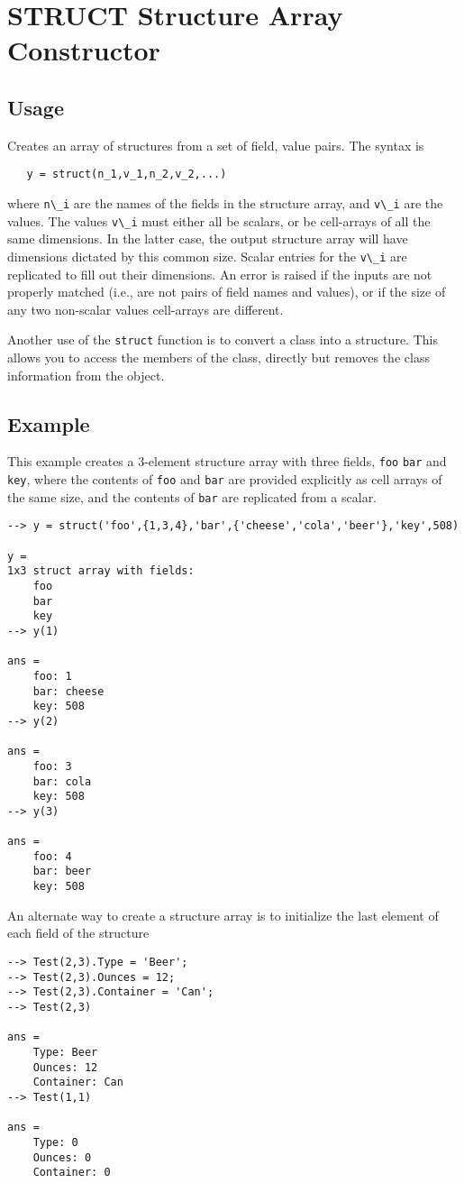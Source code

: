\section{STRUCT Structure Array Constructor}

\subsection{Usage}

Creates an array of structures from a set of field, value pairs.
The syntax is
\begin{verbatim}
   y = struct(n_1,v_1,n_2,v_2,...)
\end{verbatim}
where \verb|n\_i| are the names of the fields in the structure array, and
\verb|v\_i| are the values.  The values \verb|v\_i| must either all be
scalars, or be cell-arrays of all the same dimensions.  In the latter 
case, the
output structure array will have dimensions dictated by this common
size.  Scalar entries for the \verb|v\_i| are replicated to fill out
their dimensions. An error is raised if the inputs are not properly matched (i.e., are
not pairs of field names and values), or if the size of any two non-scalar
values cell-arrays are different.

Another use of the \verb|struct| function is to convert a class into a 
structure.  This allows you to access the members of the class, directly 
but removes the class information from the object.

\subsection{Example}

This example creates a 3-element structure array with three fields, \verb|foo|
\verb|bar| and \verb|key|, where the contents of \verb|foo| and \verb|bar| are provided 
explicitly as cell arrays of the same size, and the contents of \verb|bar| 
are replicated from a scalar.
\begin{verbatim}
--> y = struct('foo',{1,3,4},'bar',{'cheese','cola','beer'},'key',508)

y = 
1x3 struct array with fields:
    foo
    bar
    key
--> y(1)

ans = 
    foo: 1
    bar: cheese
    key: 508
--> y(2)

ans = 
    foo: 3
    bar: cola
    key: 508
--> y(3)

ans = 
    foo: 4
    bar: beer
    key: 508
\end{verbatim}

An alternate way to create a structure array is to initialize the last
element of each field of the structure
\begin{verbatim}
--> Test(2,3).Type = 'Beer';
--> Test(2,3).Ounces = 12;
--> Test(2,3).Container = 'Can';
--> Test(2,3)

ans = 
    Type: Beer
    Ounces: 12
    Container: Can
--> Test(1,1)

ans = 
    Type: 0
    Ounces: 0
    Container: 0
\end{verbatim}
